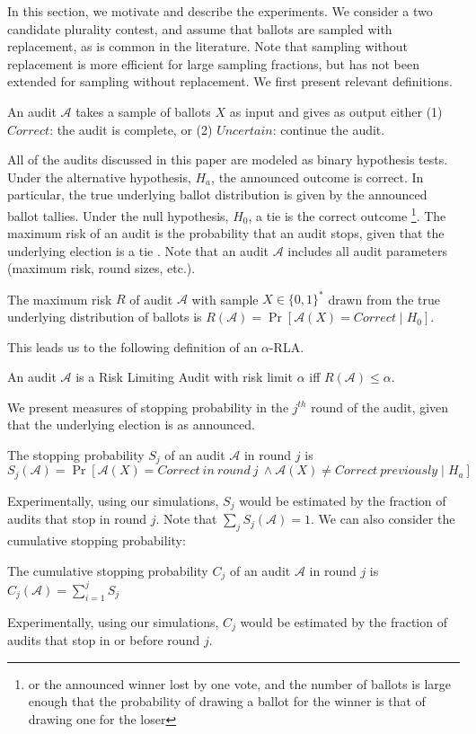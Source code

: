In this section, we motivate and describe the experiments. We consider a two candidate plurality contest, and assume that ballots are sampled with replacement, as is common in the literature. Note that sampling without replacement is more efficient for large sampling fractions, but \Minerva has not been extended for sampling without replacement. We first present relevant definitions.

\begin{definition}
An audit $\mathcal{A}$ takes a sample of ballots $X$ as input and gives as output either
(1) $Correct$: the audit is complete, or (2) $Uncertain$: continue the audit.
\end{definition}

All of the audits discussed in this paper are modeled as binary hypothesis tests. Under the alternative hypothesis, $H_a$, the announced outcome is correct. In particular, the true underlying ballot distribution is given by the announced ballot tallies. Under the null hypothesis, $H_0$, a tie is the correct outcome \footnote{or the announced winner lost by one vote, and the number of ballots is large enough that the probability of drawing a ballot for the winner is that of drawing one for the loser}.
The maximum risk of an audit is the probability that an audit stops, given that the underlying election is a tie \cite{Bayesian-RLA}. Note that an audit $\mathcal{A}$ includes all audit parameters (maximum risk, round sizes, etc.). 

\begin{definition}[Risk]
The maximum risk $R$ of audit $\mathcal{A}$ with sample $X\in \{0,1\}^*$ drawn from 
the true underlying distribution of ballots is
$R(\mathcal{A})=\Pr[\mathcal{A}(X)=Correct \mid H_0].$
\end{definition}

This leads us to the following definition of an $\alpha$-RLA.
\begin{definition}
An audit $\mathcal{A}$ is a Risk Limiting Audit with 
risk limit $\alpha$ iff 
$R(\mathcal{A}) \le \alpha.$
\end{definition}

We present measures of stopping probability in the $j^{th}$ round of the audit, given that the underlying election is as announced.
\begin{definition}
The stopping probability $S_j$ of an audit $\mathcal{A}$ in round $j$ is 
$$S_j(\mathcal{A})=\Pr[\mathcal{A}(X)=Correct ~in~round~j~\land \mathcal{A}(X) \neq Correct ~previously \mid H_a]$$
\end{definition}
Experimentally, using our simulations, $S_j$ would be estimated by the fraction of audits that stop in round $j$. Note that $\sum _j S_j(\mathcal{A})=1$. We can also consider the cumulative stopping probability: 
\begin{definition}
The cumulative stopping probability $C_j$ of an audit $\mathcal{A}$ in round $j$ is $C_j(\mathcal{A})= \sum_{i=1}^j S_j$
\end{definition}
Experimentally, using our simulations, $C_j$ would be estimated by the fraction of audits that stop in or before round $j$. 

